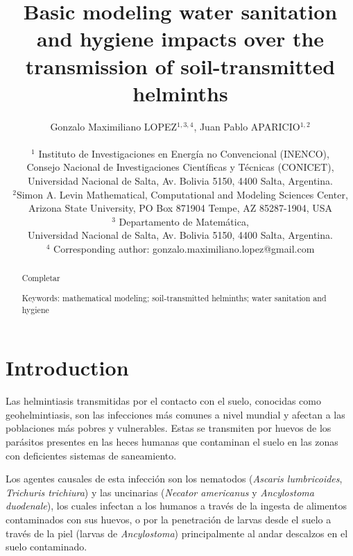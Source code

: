 \documentclass[12pt,a4paper]{article}
\title{Basic modeling water sanitation and hygiene impacts over the transmission of soil-transmitted helminths}
\author{Gonzalo Maximiliano LOPEZ$^{1,3,4}$, Juan Pablo APARICIO$^{1,2}$\\
	\\
	{\small $^1$ Instituto de Investigaciones en Energ\'ia no Convencional (INENCO),} \\ {\small Consejo Nacional de Investigaciones Cient\'ificas y T\'ecnicas (CONICET),}\\
	{\small Universidad Nacional de Salta, Av. Bolivia 5150, 4400 Salta, Argentina.}\\
	$^2${\small Simon A. Levin Mathematical, Computational and Modeling Sciences Center,} \\ {\small Arizona State University, PO Box 871904 Tempe, AZ 85287-1904, USA}\\
	{\small $^3$ Departamento de Matem\'atica,}\\{\small Universidad Nacional de Salta, Av. Bolivia 5150, 4400 Salta, Argentina.}\\
	{\small $^4$ Corresponding author: gonzalo.maximiliano.lopez@gmail.com}}
\date{}
\theoremstyle{plain}%
\theoremstyle{definition}
\theoremstyle{remark}
\begin{document}
\maketitle

\begin{abstract}
	Completar
	
	Keywords: mathematical modeling; soil-transmitted helminths; water sanitation and hygiene
\end{abstract}

\tableofcontents



\section{Introduction}
{\color{red}
%	
%	
%
	Las helmintiasis transmitidas por el contacto con el suelo, conocidas como geohelmintiasis, son las infecciones más comunes a nivel mundial y afectan a las poblaciones más pobres y vulnerables. 
	Estas se transmiten por huevos de los parásitos presentes en las heces humanas que contaminan el suelo en las zonas con deficientes sistemas de saneamiento.
	
	Los agentes causales de esta infección son los nematodos (\textit{Ascaris lumbricoides}, \textit{Trichuris trichiura}) y las uncinarias (\textit{Necator americanus} y \textit{Ancylostoma duodenale}), los cuales infectan a los humanos a través de la ingesta de alimentos contaminados con sus huevos, o por la penetración de larvas desde el suelo a través de la piel (larvas de \textit{Ancylostoma}) principalmente al andar descalzos en el suelo contaminado.
	
	
}
\end{document}
